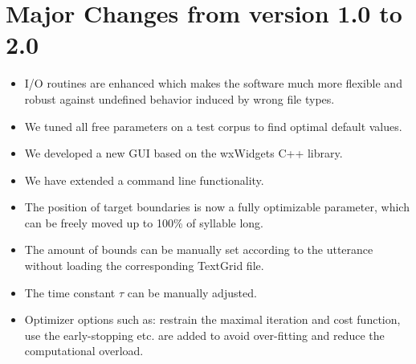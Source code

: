 \chapter{Major Changes from version 1.0 to 2.0}
\begin{itemize}
	\item I/O routines are enhanced which makes the software much more flexible and robust against undefined behavior induced by wrong file types.
	\item We tuned all free parameters on a test corpus to find optimal default values.
	\item We developed a new GUI based on the wxWidgets C++ library.
	\item We have extended a command line functionality.
	\item The position of target boundaries is now a fully optimizable parameter, which can be freely moved up to 100\% of syllable long. 
	\item The amount of bounds can be manually set according to the utterance without loading the corresponding TextGrid file.
	\item The time constant $\tau$ can be manually adjusted.
	\item Optimizer options such as: restrain the maximal iteration and cost function, use the early-stopping etc. are added to avoid over-fitting and reduce the computational overload.
\end{itemize}